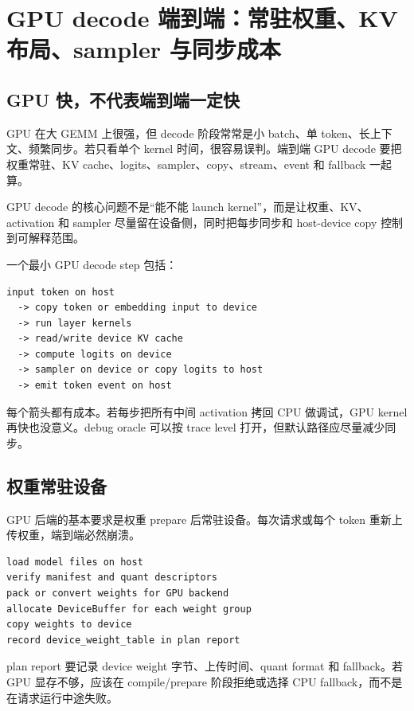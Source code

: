 \section{GPU decode 端到端：常驻权重、KV 布局、sampler 与同步成本}

\subsection{GPU 快，不代表端到端一定快}

GPU 在大 GEMM 上很强，但 decode 阶段常常是小 batch、单 token、长上下文、频繁同步。若只看单个 kernel 时间，很容易误判。端到端 GPU decode 要把权重常驻、KV cache、logits、sampler、copy、stream、event 和 fallback 一起算。

\begin{keyidea}
GPU decode 的核心问题不是“能不能 launch kernel”，而是让权重、KV、activation 和 sampler 尽量留在设备侧，同时把每步同步和 host-device copy 控制到可解释范围。
\end{keyidea}

一个最小 GPU decode step 包括：

\begin{lstlisting}[numbers=none,caption={GPU decode step 账本}]
input token on host
  -> copy token or embedding input to device
  -> run layer kernels
  -> read/write device KV cache
  -> compute logits on device
  -> sampler on device or copy logits to host
  -> emit token event on host
\end{lstlisting}

每个箭头都有成本。若每步把所有中间 activation 拷回 CPU 做调试，GPU kernel 再快也没意义。debug oracle 可以按 trace level 打开，但默认路径应尽量减少同步。

\subsection{权重常驻设备}

GPU 后端的基本要求是权重 prepare 后常驻设备。每次请求或每个 token 重新上传权重，端到端必然崩溃。

\begin{lstlisting}[numbers=none,caption={GPU prepare 阶段}]
load model files on host
verify manifest and quant descriptors
pack or convert weights for GPU backend
allocate DeviceBuffer for each weight group
copy weights to device
record device_weight_table in plan report
\end{lstlisting}

plan report 要记录 device weight 字节、上传时间、quant format 和 fallback。若 GPU 显存不够，应该在 compile/prepare 阶段拒绝或选择 CPU fallback，而不是在请求运行中途失败。

